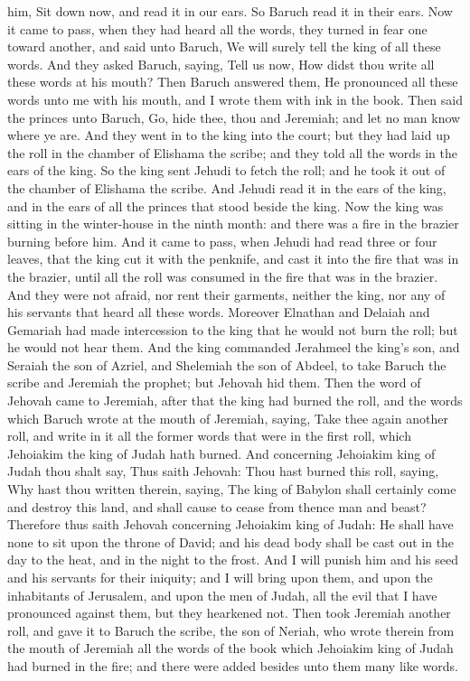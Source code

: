 him, Sit down now, and read it in our ears. So Baruch read it in their ears. Now it came to pass, when they had heard all the words, they turned in fear one toward another, and said unto Baruch, We will surely tell the king of all these words. And they asked Baruch, saying, Tell us now, How didst thou write all these words at his mouth? Then Baruch answered them, He pronounced all these words unto me with his mouth, and I wrote them with ink in the book. Then said the princes unto Baruch, Go, hide thee, thou and Jeremiah; and let no man know where ye are.  And they went in to the king into the court; but they had laid up the roll in the chamber of Elishama the scribe; and they told all the words in the ears of the king. So the king sent Jehudi to fetch the roll; and he took it out of the chamber of Elishama the scribe. And Jehudi read it in the ears of the king, and in the ears of all the princes that stood beside the king. Now the king was sitting in the winter-house in the ninth month: and there was a fire in the brazier burning before him. And it came to pass, when Jehudi had read three or four leaves, that the king cut it with the penknife, and cast it into the fire that was in the brazier, until all the roll was consumed in the fire that was in the brazier. And they were not afraid, nor rent their garments, neither the king, nor any of his servants that heard all these words. Moreover Elnathan and Delaiah and Gemariah had made intercession to the king that he would not burn the roll; but he would not hear them. And the king commanded Jerahmeel the king’s son, and Seraiah the son of Azriel, and Shelemiah the son of Abdeel, to take Baruch the scribe and Jeremiah the prophet; but Jehovah hid them.  Then the word of Jehovah came to Jeremiah, after that the king had burned the roll, and the words which Baruch wrote at the mouth of Jeremiah, saying, Take thee again another roll, and write in it all the former words that were in the first roll, which Jehoiakim the king of Judah hath burned. And concerning Jehoiakim king of Judah thou shalt say, Thus saith Jehovah: Thou hast burned this roll, saying, Why hast thou written therein, saying, The king of Babylon shall certainly come and destroy this land, and shall cause to cease from thence man and beast? Therefore thus saith Jehovah concerning Jehoiakim king of Judah: He shall have none to sit upon the throne of David; and his dead body shall be cast out in the day to the heat, and in the night to the frost. And I will punish him and his seed and his servants for their iniquity; and I will bring upon them, and upon the inhabitants of Jerusalem, and upon the men of Judah, all the evil that I have pronounced against them, but they hearkened not. Then took Jeremiah another roll, and gave it to Baruch the scribe, the son of Neriah, who wrote therein from the mouth of Jeremiah all the words of the book which Jehoiakim king of Judah had burned in the fire; and there were added besides unto them many like words. 

